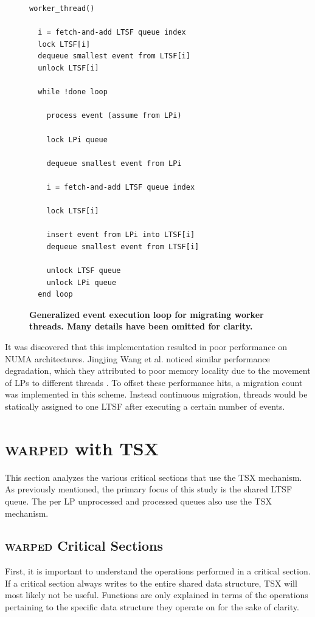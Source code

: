 \documentclass[11pt]{book}
\begin{document}
\linespread{1.0}
\begin{figure}
\begin{verbatim}
worker_thread()

  i = fetch-and-add LTSF queue index
  lock LTSF[i]
  dequeue smallest event from LTSF[i]
  unlock LTSF[i]

  while !done loop

    process event (assume from LPi)

    lock LPi queue
    
    dequeue smallest event from LPi

    i = fetch-and-add LTSF queue index

    lock LTSF[i]

    insert event from LPi into LTSF[i]
    dequeue smallest event from LTSF[i]

    unlock LTSF queue
    unlock LPi queue
  end loop
\end{verbatim}
\caption{\textbf{Generalized event execution loop for migrating worker threads.  Many
    details have been omitted for clarity.}}\label{migratinWorkerThreadAlgorithm}
\end{figure}

It was discovered that this implementation resulted in poor performance on NUMA
architectures.  Jingjing Wang et al. noticed similar performance degradation, which they
attributed to poor memory locality due to the movement of LPs to different threads
\cite{numa}.  To offset these performance hits, a migration count was implemented in this
scheme.  Instead continuous migration, threads would be statically assigned to one LTSF
after executing a certain number of events.

\chapter{\textsc{warped} with TSX}

This section analyzes the various critical sections that use the TSX mechanism.
As previously mentioned, the primary focus of this study is the shared LTSF
queue.  The per LP unprocessed and processed queues also use the TSX mechanism.

\section{\textsc{warped} Critical Sections}

First, it is important to understand the operations performed in a critical
section.  If a critical section always writes to the entire shared data
structure, TSX will most likely not be useful.  Functions are only explained in
terms of the operations pertaining to the specific data structure they operate
on for the sake of clarity.  
\end{document}
